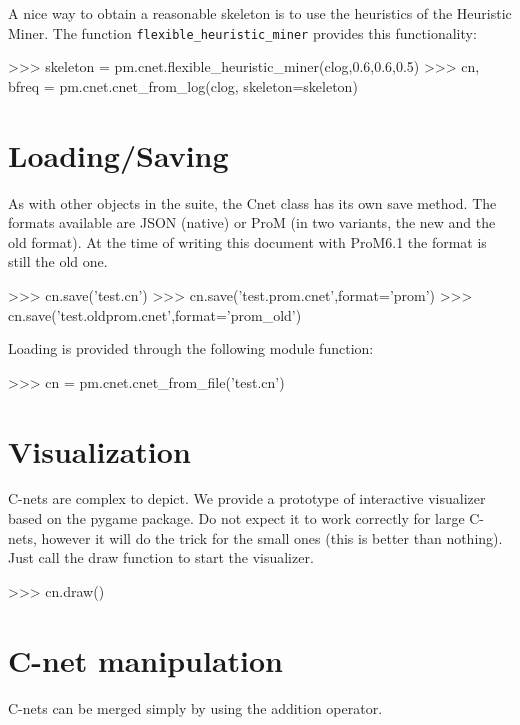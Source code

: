 \documentclass[a4paper,10pt]{book}
\begin{document}
A nice way to obtain a reasonable skeleton is to use the heuristics of the Heuristic Miner. The function \texttt{flexible\_heuristic\_miner} provides this functionality:\\

\begin{pycode}
>>> skeleton = pm.cnet.flexible_heuristic_miner(clog,0.6,0.6,0.5)
>>> cn, bfreq = pm.cnet.cnet_from_log(clog, skeleton=skeleton)
\end{pycode}

\section{Loading/Saving}
As with other objects in the suite, the Cnet class has its own save method. The formats available are JSON (native) or ProM (in two variants, the new and the old format). At the time of writing this document with ProM6.1 the format is still the old one.\\

\begin{pycode}
>>> cn.save('test.cn')
>>> cn.save('test.prom.cnet',format='prom')
>>> cn.save('test.oldprom.cnet',format='prom_old')
\end{pycode}

Loading is provided through the following module function:\\

\begin{pycode}
>>> cn = pm.cnet.cnet_from_file('test.cn')
\end{pycode}

\section{Visualization}
C-nets are complex to depict. We provide a prototype of interactive visualizer based on the pygame package. Do not expect it to work correctly for large C-nets, however it will do the trick for the small ones (this is better than nothing). Just call the draw function to start the visualizer.\\

\begin{pycode}
>>> cn.draw()
\end{pycode}

\section{C-net manipulation}
C-nets can be merged simply by using the addition operator.\\
\end{document}
